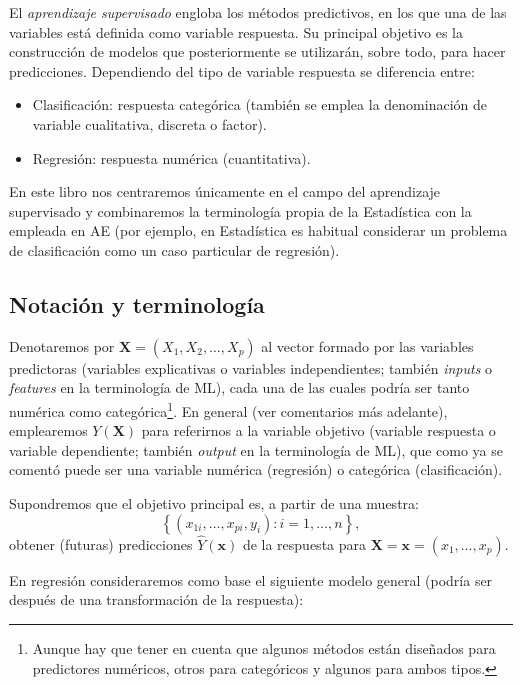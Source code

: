 \documentclass[]{book}
\theoremstyle{break}
\theoremstyle{definition}
\theoremstyle{definition}
\theoremstyle{definition}
\theoremstyle{remark}
\begin{document}
El \emph{aprendizaje supervisado} engloba los métodos predictivos, en
los que una de las variables está definida como variable respuesta. Su
principal objetivo es la construcción de modelos que posteriormente se
utilizarán, sobre todo, para hacer predicciones. Dependiendo del tipo de
variable respuesta se diferencia entre:

\begin{itemize}
\item
  Clasificación: respuesta categórica (también se emplea la denominación
  de variable cualitativa, discreta o factor).
\item
  Regresión: respuesta numérica (cuantitativa).
\end{itemize}

En este libro nos centraremos únicamente en el campo del aprendizaje
supervisado y combinaremos la terminología propia de la Estadística con
la empleada en AE (por ejemplo, en Estadística es habitual considerar un
problema de clasificación como un caso particular de regresión).

\subsection{Notación y terminología}\label{notacion}

Denotaremos por \(\mathbf{X}=(X_1, X_2, \ldots, X_p)\) al vector formado
por las variables predictoras (variables explicativas o variables
independientes; también \emph{inputs} o \emph{features} en la
terminología de ML), cada una de las cuales podría ser tanto numérica
como categórica\footnote{Aunque hay que tener en cuenta que algunos
  métodos están diseñados para predictores numéricos, otros para
  categóricos y algunos para ambos tipos.}. En general (ver comentarios
más adelante), emplearemos \(Y\left(\mathbf{X} \right)\) para referirnos
a la variable objetivo (variable respuesta o variable dependiente;
también \emph{output} en la terminología de ML), que como ya se comentó
puede ser una variable numérica (regresión) o categórica
(clasificación).

Supondremos que el objetivo principal es, a partir de una muestra:
\[\left\{ \left( x_{1i}, \ldots, x_{pi}, y_{i} \right)  : i = 1, \ldots, n \right\},\]
obtener (futuras) predicciones \(\hat Y\left(\mathbf{x} \right)\) de la
respuesta para
\(\mathbf{X}=\mathbf{x}=\left(x_{1}, \ldots, x_{p}\right)\).

En regresión consideraremos como base el siguiente modelo general
(podría ser después de una transformación de la respuesta):
\end{document}
